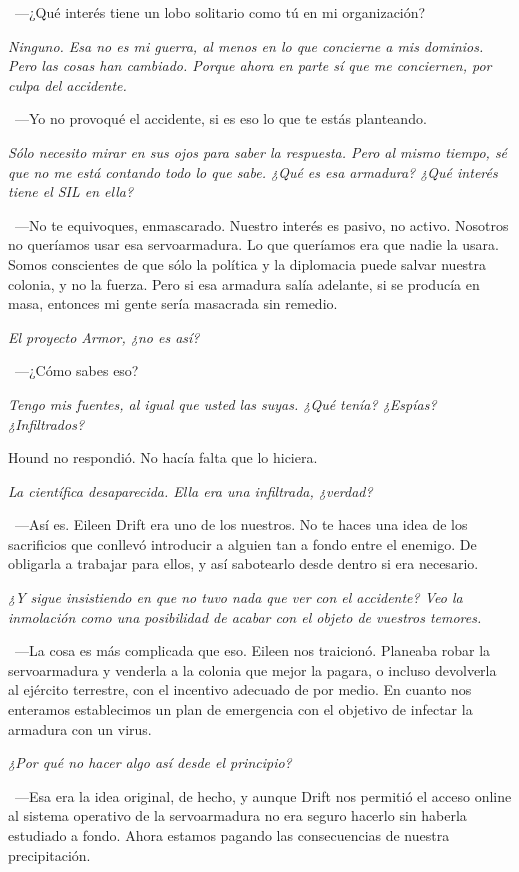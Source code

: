 ~---¿Qué interés tiene un lobo solitario como tú en mi organización?

\emph{Ninguno. Esa no es mi guerra, al menos en lo que concierne a mis dominios. Pero las cosas han cambiado. Porque ahora en parte sí que me conciernen, por culpa del accidente.}

~---Yo no provoqué el accidente, si es eso lo que te estás planteando.

\emph{Sólo necesito mirar en sus ojos para saber la respuesta. Pero al mismo tiempo, sé que no me está contando todo lo que sabe. ¿Qué es esa armadura? ¿Qué interés tiene el SIL en ella?}

~---No te equivoques, enmascarado. Nuestro interés es pasivo, no activo. Nosotros no queríamos usar esa servoarmadura. Lo que queríamos era que nadie la usara. Somos conscientes de que sólo la política y la diplomacia puede salvar nuestra colonia, y no la fuerza. Pero si esa armadura salía adelante, si se producía en masa, entonces mi gente sería masacrada sin remedio.

\emph{El proyecto Armor, ¿no es así?}

~---¿Cómo sabes eso?

\emph{Tengo mis fuentes, al igual que usted las suyas. ¿Qué tenía? ¿Espías? ¿Infiltrados?}

Hound no respondió. No hacía falta que lo hiciera.

\emph{La científica desaparecida. Ella era una infiltrada, ¿verdad?}

~---Así es. Eileen Drift era uno de los nuestros. No te haces una idea de los sacrificios que conllevó introducir a alguien tan a fondo entre el enemigo. De obligarla a trabajar para ellos, y así sabotearlo desde dentro si era necesario.

\emph{¿Y sigue insistiendo en que no tuvo nada que ver con el accidente? Veo la inmolación como una posibilidad de acabar con el objeto de vuestros temores.}

~---La cosa es más complicada que eso. Eileen nos traicionó. Planeaba robar la servoarmadura y venderla a la colonia que mejor la pagara, o incluso devolverla al ejército terrestre, con el incentivo adecuado de por medio. En cuanto nos enteramos establecimos un plan de emergencia con el objetivo de infectar la armadura con un virus.

\emph{¿Por qué no hacer algo así desde el principio?}

~---Esa era la idea original, de hecho, y aunque Drift nos permitió el acceso online al sistema operativo de la servoarmadura no era seguro hacerlo sin haberla estudiado a fondo. Ahora estamos pagando las consecuencias de nuestra precipitación.

